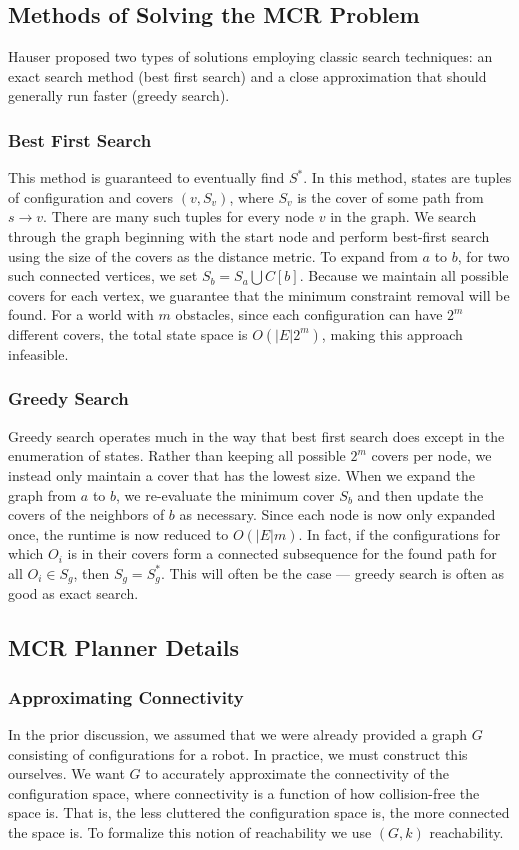\subsection{Methods of Solving the MCR Problem} \label{mcr:solving}
Hauser proposed two types of solutions employing classic search techniques: an exact search method (best first search) and a close approximation that should generally run faster (greedy search).

\subsubsection{Best First Search}
This method is guaranteed to eventually find $S^{*}$. In this method, states are tuples of configuration and covers $(v, S_v)$, where $S_v$ is the cover of some path from $s \rightarrow v$. There are many such tuples for every node $v$ in the graph. We search through the graph beginning with the start node and perform best-first search using the size of the covers as the distance metric. To expand from $a$ to $b$, for two such connected vertices, we set $S_b = S_a \bigcup C[b]$. Because we maintain all possible covers for each vertex, we guarantee that the minimum constraint removal will be found. For a world with $m$ obstacles, since each configuration can have $2^m$ different covers, the total state space is $O(|E|2^m)$, making this approach infeasible.

\subsubsection{Greedy Search}
Greedy search operates much in the way that best first search does except in the enumeration of states. Rather than keeping all possible $2^m$ covers per node, we instead only maintain a cover that has the lowest size. When we expand the graph from $a$ to $b$, we re-evaluate the minimum cover $S_b$ and then update the covers of the neighbors of $b$ as necessary. Since each node is now only expanded once, the runtime is now reduced to $O(|E|m)$. In fact, if the configurations for which $O_i$ is in their covers form a connected subsequence for the found path for all $O_i \in S_g$, then $S_g = S^{*}_g$. This will often be the case --- greedy search is often as good as exact search.

\subsection{MCR Planner Details}
\subsubsection{Approximating Connectivity}
In the prior discussion, we assumed that we were already provided a graph $G$ consisting of configurations for a robot. In practice, we must construct this ourselves. We want $G$ to accurately approximate the connectivity of the configuration space, where connectivity is a function of how collision-free the space is. That is, the less cluttered the configuration space is, the more connected the space is. To formalize this notion of reachability we use $(G,k)$ reachability.

